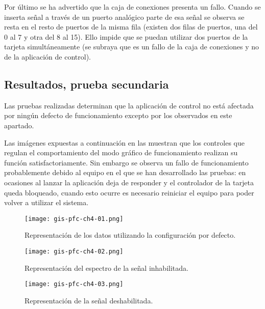 Por último se ha advertido que la caja de conexiones presenta un fallo.
Cuando se inserta señal a través de un puerto analógico parte de esa señal
se observa se resta en el resto de puertos de la misma fila (existen dos
filas de puertos, una del 0 al 7 y otra del 8 al 15). Ello impide que se
puedan utilizar dos puertos de la tarjeta simultáneamente (se subraya que
es un fallo de la caja de conexiones y no de la aplicación de control).


\subsection{Resultados, prueba secundaria}

Las pruebas realizadas determinan que la aplicación de control no está
afectada por ningún defecto de funcionamiento excepto por los observados en
este apartado.

Las imágenes expuestas a continuación en las
 muestran que los controles que
regulan el comportamiento del modo gráfico de funcionamiento realizan su
función satisfactoriamente. Sin embargo se observa un fallo de
funcionamiento probablemente debido al equipo en el que se han desarrollado
las pruebas: en ocasiones al lanzar la aplicación \matlab{} deja de
responder y el controlador de la tarjeta queda bloqueado, cuando esto
ocurre es necesario reiniciar el equipo para poder volver a utilizar el
sistema.

\begin{figure}
    \begin{center}
	\texttt{[image: gis-pfc-ch4-01.png]}
    \end{center}
    \caption[Configuración por defecto]{Representación de los datos
    utilizando la configuración por defecto.}
    \label{fig:default}
\end{figure}

\begin{figure}[p]
    \begin{center}
	\texttt{[image: gis-pfc-ch4-02.png]}
    \end{center}
    \caption[Representación del espectro de la señal
    inhabilitada]{Representación del espectro de la señal inhabilitada.}
    \label{fig:specter-disabled}
\end{figure}

\begin{figure}[p]
    \begin{center}
	\texttt{[image: gis-pfc-ch4-03.png]}
    \end{center}
    \caption[Representación de la señal deshabilitada]{Representación de la
    señal deshabilitada.}
    \label{fig:signal-disabled}
\end{figure}

